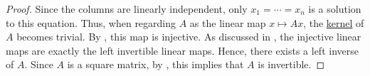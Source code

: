 \begin{proof}
  Since the columns are linearly independent, only \( x_1 = \cdots = x_n \) is a solution to this equation. Thus, when regarding \( A \) as the linear map \( x \mapsto Ax \), the \hyperref[def:module/kernel]{kernel} of \( A \) becomes trivial. By , this map is injective. As discussed in , the injective linear maps are exactly the left invertible linear maps. Hence, there exists a left inverse of \( A \). Since \( A \) is a square matrix, by , this implies that \( A \) is invertible.
\end{proof}
